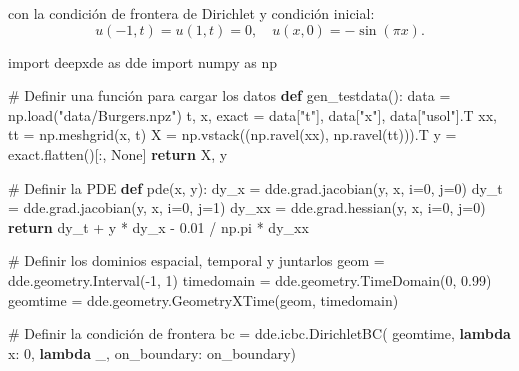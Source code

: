 \documentclass[
  spanish,
  us-letterpaper,
]{scrreprt}
\newenvironment{Shaded}{\begin{snugshade}}{\end{snugshade}}
\newcommand{\CommentTok}[1]{\textcolor[rgb]{0.37,0.37,0.37}{#1}}
\newcommand{\ControlFlowTok}[1]{\textcolor[rgb]{0.00,0.23,0.31}{\textbf{#1}}}
\newcommand{\DecValTok}[1]{\textcolor[rgb]{0.68,0.00,0.00}{#1}}
\newcommand{\FloatTok}[1]{\textcolor[rgb]{0.68,0.00,0.00}{#1}}
\newcommand{\ImportTok}[1]{\textcolor[rgb]{0.00,0.46,0.62}{#1}}
\newcommand{\KeywordTok}[1]{\textcolor[rgb]{0.00,0.23,0.31}{\textbf{#1}}}
\newcommand{\NormalTok}[1]{\textcolor[rgb]{0.00,0.23,0.31}{#1}}
\newcommand{\OperatorTok}[1]{\textcolor[rgb]{0.37,0.37,0.37}{#1}}
\newcommand{\StringTok}[1]{\textcolor[rgb]{0.13,0.47,0.30}{#1}}
\newcommand{\VariableTok}[1]{\textcolor[rgb]{0.07,0.07,0.07}{#1}}
\theoremstyle{plain}
\theoremstyle{definition}
\theoremstyle{remark}
\begin{document}
con la condición de frontera de Dirichlet y condición inicial: \[
u(-1,t) = u(1,t) = 0, \quad u(x,0)=-\sin(\pi x).
\]

\begin{Shaded}
\begin{Highlighting}[]
\ImportTok{import}\NormalTok{ deepxde }\ImportTok{as}\NormalTok{ dde}
\ImportTok{import}\NormalTok{ numpy }\ImportTok{as}\NormalTok{ np}

\CommentTok{\# Definir una función para cargar los datos}
\KeywordTok{def}\NormalTok{ gen\_testdata():}
\NormalTok{    data }\OperatorTok{=}\NormalTok{ np.load(}\StringTok{"data/Burgers.npz"}\NormalTok{)}
\NormalTok{    t, x, exact }\OperatorTok{=}\NormalTok{ data[}\StringTok{"t"}\NormalTok{], data[}\StringTok{"x"}\NormalTok{], data[}\StringTok{"usol"}\NormalTok{].T}
\NormalTok{    xx, tt }\OperatorTok{=}\NormalTok{ np.meshgrid(x, t)}
\NormalTok{    X }\OperatorTok{=}\NormalTok{ np.vstack((np.ravel(xx), np.ravel(tt))).T}
\NormalTok{    y }\OperatorTok{=}\NormalTok{ exact.flatten()[:, }\VariableTok{None}\NormalTok{]}
    \ControlFlowTok{return}\NormalTok{ X, y}

\CommentTok{\# Definir la PDE}
\KeywordTok{def}\NormalTok{ pde(x, y):}
\NormalTok{    dy\_x }\OperatorTok{=}\NormalTok{ dde.grad.jacobian(y, x, i}\OperatorTok{=}\DecValTok{0}\NormalTok{, j}\OperatorTok{=}\DecValTok{0}\NormalTok{)}
\NormalTok{    dy\_t }\OperatorTok{=}\NormalTok{ dde.grad.jacobian(y, x, i}\OperatorTok{=}\DecValTok{0}\NormalTok{, j}\OperatorTok{=}\DecValTok{1}\NormalTok{)}
\NormalTok{    dy\_xx }\OperatorTok{=}\NormalTok{ dde.grad.hessian(y, x, i}\OperatorTok{=}\DecValTok{0}\NormalTok{, j}\OperatorTok{=}\DecValTok{0}\NormalTok{)}
    \ControlFlowTok{return}\NormalTok{ dy\_t }\OperatorTok{+}\NormalTok{ y }\OperatorTok{*}\NormalTok{ dy\_x }\OperatorTok{{-}} \FloatTok{0.01} \OperatorTok{/}\NormalTok{ np.pi }\OperatorTok{*}\NormalTok{ dy\_xx}

\CommentTok{\# Definir los dominios espacial, temporal y juntarlos}
\NormalTok{geom }\OperatorTok{=}\NormalTok{ dde.geometry.Interval(}\OperatorTok{{-}}\DecValTok{1}\NormalTok{, }\DecValTok{1}\NormalTok{)}
\NormalTok{timedomain }\OperatorTok{=}\NormalTok{ dde.geometry.TimeDomain(}\DecValTok{0}\NormalTok{, }\FloatTok{0.99}\NormalTok{)}
\NormalTok{geomtime }\OperatorTok{=}\NormalTok{ dde.geometry.GeometryXTime(geom, timedomain)}

\CommentTok{\# Definir la condición de frontera}
\NormalTok{bc }\OperatorTok{=}\NormalTok{ dde.icbc.DirichletBC(}
\NormalTok{    geomtime,}
    \KeywordTok{lambda}\NormalTok{ x: }\DecValTok{0}\NormalTok{,}
    \KeywordTok{lambda}\NormalTok{ \_, on\_boundary: on\_boundary)}


\end{Highlighting}
\end{Shaded}
\end{document}
